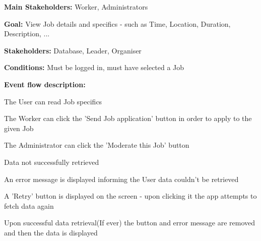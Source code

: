 				\noindent {}
				\begin{packed_item}
					\item \textbf{Main Stakeholders:} Worker, Administrators
					\item \textbf{Goal:} View Job details and specifics - such as Time, Location, Duration, Description, ...
					\item \textbf{Stakeholders: } Database, Leader, Organiser
					\item \textbf{Conditions: } Must be logged in, must have selected a Job
					\item \textbf{Event flow description: }
					\begin{packed_enum}
						\item The User can read Job specifics
						\item The Worker can click the 'Send Job application' button in order to apply to the given Job
						\item The Administrator can click the 'Moderate this Job' button
					\end{packed_enum}
					
					\begin{packed_item}
						\item[1.a] Data not successfully retrieved
						\item[] \begin{packed_enum}
							\item An error message is displayed informing the User data couldn't be retrieved
							\item A 'Retry' button is displayed on the screen - upon clicking it the app attempts to fetch data again
							\item Upon successful data retrieval(If ever) the button and error message are removed and then the data is displayed
						\end{packed_enum}
					\end{packed_item}
				\end{packed_item}
			
